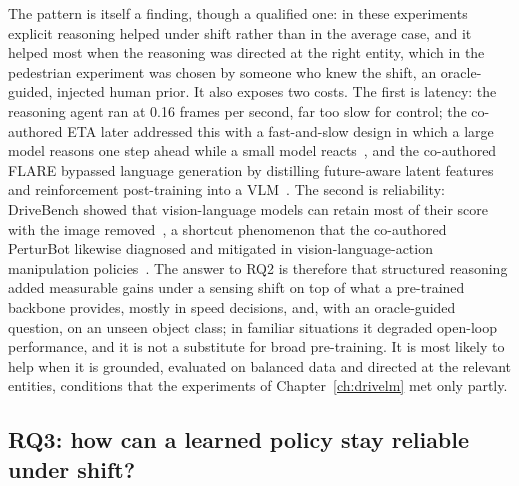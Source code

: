 The pattern is itself a finding, though a qualified one: in these experiments explicit reasoning helped under shift rather than in the average case, and it helped most when the reasoning was directed at the right entity, which in the pedestrian experiment was chosen by someone who knew the shift, an oracle-guided, injected human prior. It also exposes two costs. The first is latency: the reasoning agent ran at 0.16 frames per second, far too slow for control; the co-authored ETA later addressed this with a fast-and-slow design in which a large model reasons one step ahead while a small model reacts~\cite{hamdan2025eta}, and the co-authored FLARE bypassed language generation by distilling future-aware latent features and reinforcement post-training into a VLM~\cite{xie2026flare}. The second is reliability: DriveBench showed that vision-language models can retain most of their score with the image removed~\cite{xie2025vlms}, a shortcut phenomenon that the co-authored PerturBot likewise diagnosed and mitigated in vision-language-action manipulation policies~\cite{liu2026perturbot}. The answer to RQ2 is therefore that structured reasoning added measurable gains under a sensing shift on top of what a pre-trained backbone provides, mostly in speed decisions, and, with an oracle-guided question, on an unseen object class; in familiar situations it degraded open-loop performance, and it is not a substitute for broad pre-training. It is most likely to help when it is grounded, evaluated on balanced data and directed at the relevant entities, conditions that the experiments of Chapter~\ref{ch:drivelm} met only partly.

\subsection{RQ3: how can a learned policy stay reliable under shift?}

